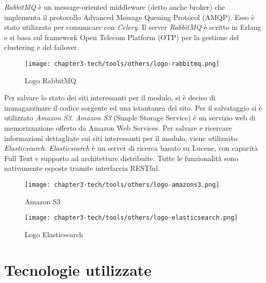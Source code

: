 \noindent
\textit{RabbitMQ} è un message-oriented middleware (detto anche \gls{broker}) che implementa il protocollo Advanced Message Queuing Protocol (AMQP). Esso è stato utilizzato per comunicare con \textit{Celery}. Il server \textit{RabbitMQ} è scritto in Erlang e si basa sul framework Open Telecom Platform (OTP) per la gestione del clustering e del failover.
\begin{figure}[!h] 
    \centering 
    \texttt{[image: chapter3-tech/tools/others/logo-rabbitmq.png]} 
    \caption{Logo RabbitMQ}
    \label{fig:rabbitmq} 
\end{figure}

\noindent
Per salvare lo stato dei siti interessanti per il modulo, si è deciso di immagazzinare il codice sorgente ed una istantanea del sito. Per il salvataggio si è utilizzato \textit{Amazon S3}. \textit{Amazon S3} (Simple Storage Service) è un servizio web di memorizzazione offerto da Amazon Web Services.\newline{} Per salvare e ricercare informazioni dettagliate sui siti interessanti per il modulo, viene utilizzato \textit{Elasticsearch}. \textit{Elasticsearch} è un server di ricerca basato su Lucene, con capacità Full Text e supporto ad architetture distribuite. Tutte le funzionalità sono nativamente esposte tramite interfaccia RESTful.
\begin{figure}[!h]
    \begin{minipage}{.5\textwidth} 
        \centering 
        \texttt{[image: chapter3-tech/tools/others/logo-amazons3.png]} 
        \caption{Amazon S3} 
        \label{fig:amazons3} 
    \end{minipage}%
    \begin{minipage}{.5\textwidth} 
        \centering 
        \texttt{[image: chapter3-tech/tools/others/logo-elasticsearch.png]} 
        \caption{Logo Elasticsearch} 
        \label{fig:elasticsearch} 
    \end{minipage}%
\end{figure} 

\section{Tecnologie utilizzate}

